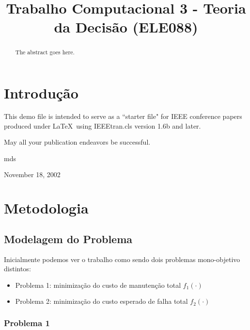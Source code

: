 \documentclass[conference]{IEEEtran}
\begin{document}
\title{Trabalho Computacional 3 - Teoria da Decisão (ELE088)}

\author{
\and
{}
\and
{}
}

\maketitle

\begin{abstract}
The abstract goes here.
\end{abstract}

\section{Introdução}
This demo file is intended to serve as a ``starter file"
for IEEE conference papers produced under \LaTeX\ using IEEEtran.cls version
1.6b and later.

 May all your publication endeavors be successful.

\hfill mds
 
\hfill November 18, 2002

\section{Metodologia}


\subsection{Modelagem do Problema}
Inicialmente podemos ver o trabalho como sendo dois problemas mono-objetivo distintos:

\begin{itemize}
	\item Problema 1: minimização do custo de manutenção total $f_1 (\cdot)$
	\item Problema 2: minimização do custo esperado de falha total $f_2 (\cdot)$
\end{itemize}

\subsubsection{Problema 1}
\end{document}
